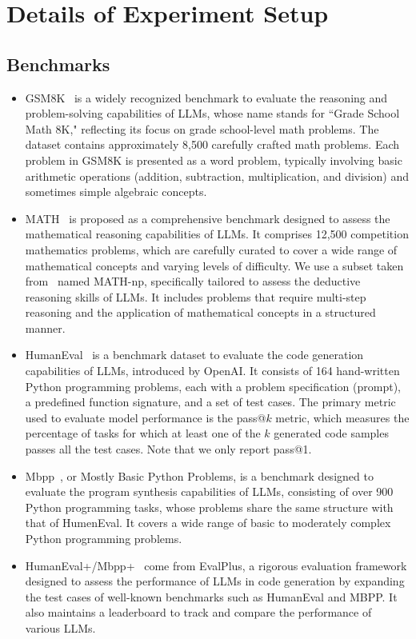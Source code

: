 \section{Details of Experiment Setup}
\subsection{Benchmarks}\label{app:datasets}
\begin{itemize}
    \item GSM8K~\cite{GSM8K} is a widely recognized benchmark to evaluate the reasoning and problem-solving capabilities of LLMs, whose name stands for ``Grade School Math 8K," reflecting its focus on grade school-level math problems. The dataset contains approximately 8,500 carefully crafted math problems. Each problem in GSM8K is presented as a word problem, typically involving basic arithmetic operations (addition, subtraction, multiplication, and division) and sometimes simple algebraic concepts.
    
    \item MATH~\cite{MATH} is proposed as a comprehensive benchmark designed to assess the mathematical reasoning capabilities of LLMs. It comprises 12,500 competition mathematics problems, which are carefully curated to cover a wide range of mathematical concepts and varying levels of difficulty.
    We use a subset taken from~\cite{DeductiveVeriCoT} named MATH-np, specifically tailored to assess the deductive reasoning skills of LLMs. It includes problems that require multi-step reasoning and the application of mathematical concepts in a structured manner.

    \item HumanEval~\cite{HumanEval} is a benchmark dataset to evaluate the code generation capabilities of LLMs, introduced by OpenAI. It consists of 164 hand-written Python programming problems, each with a problem specification (prompt), a predefined function signature, and a set of test cases. The primary metric used to evaluate model performance is the pass@$k$ metric, which measures the percentage of tasks for which at least one of the $k$ generated code samples passes all the test cases. Note that we only report pass@1.

    \item Mbpp~\cite{Mbpp}, or Mostly Basic Python Problems, is a benchmark designed to evaluate the program synthesis capabilities of LLMs, consisting of over 900 Python programming tasks, whose problems share the same structure with that of HumenEval. It covers a wide range of basic to moderately complex Python programming problems.

    \item HumanEval+/Mbpp+~\cite{EvalPlus} come from EvalPlus, a rigorous evaluation framework designed to assess the performance of LLMs in code generation by expanding the test cases of well-known benchmarks such as HumanEval and MBPP. It also maintains a leaderboard to track and compare the performance of various LLMs.
\end{itemize}

